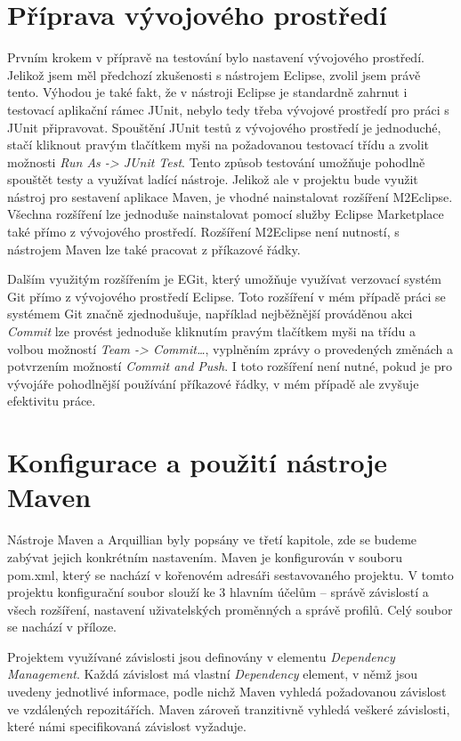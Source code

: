 \documentclass[
    color,   %
	table,   %
    twoside, %
]{fithesis3}
\begin{document}
\section{Příprava vývojového prostředí}
Prvním krokem v přípravě na testování bylo nastavení vývojového prostředí. Jelikož jsem měl předchozí zkušenosti s nástrojem Eclipse, zvolil jsem právě tento. Výhodou je také fakt, že v nástroji Eclipse je standardně zahrnut i testovací aplikační rámec JUnit, nebylo tedy třeba vývojové prostředí  pro práci s JUnit připravovat. Spouštění JUnit testů z vývojového prostředí je jednoduché, stačí kliknout pravým tlačítkem myši na požadovanou testovací třídu a zvolit možnosti \emph{Run As -> JUnit Test}. Tento způsob testování umožňuje pohodlně spouštět testy a využívat ladící nástroje. Jelikož ale v projektu bude využit nástroj pro sestavení aplikace Maven, je vhodné nainstalovat rozšíření M2Eclipse. Všechna rozšíření lze jednoduše nainstalovat pomocí služby Eclipse Marketplace také přímo z vývojového prostředí. Rozšíření M2Eclipse není nutností, s nástrojem Maven lze také pracovat z příkazové řádky.

Dalším využitým rozšířením je EGit, který umožňuje využívat verzovací systém Git přímo z vývojového prostředí Eclipse. Toto rozšíření v mém případě práci se systémem Git značně zjednodušuje, například nejběžnější prováděnou akci \emph{Commit} lze provést jednoduše kliknutím pravým tlačítkem myši na třídu a volbou možností \emph{Team -> Commit\ldots}, vyplněním zprávy o provedených změnách a potvrzením možností \emph{Commit and Push}. I toto rozšíření není nutné, pokud je pro vývojáře pohodlnější používání příkazové řádky, v mém případě ale zvyšuje efektivitu práce.

\section{Konfigurace a použití nástroje Maven}
Nástroje Maven a Arquillian byly popsány ve třetí kapitole, zde se budeme zabývat jejich konkrétním nastavením. Maven je konfigurován v souboru pom.xml, který se nachází v kořenovém adresáři sestavovaného projektu. V tomto projektu konfigurační soubor slouží ke 3 hlavním účelům – správě závislostí a všech rozšíření, nastavení uživatelských proměnných a správě profilů. Celý soubor se nachází v příloze.

Projektem využívané závislosti jsou definovány v elementu \emph{Dependency Management}. Každá závislost má vlastní \emph{Dependency} element, v němž jsou uvedeny jednotlivé informace, podle nichž Maven vyhledá požadovanou závislost ve vzdálených repozitářích. Maven zároveň tranzitivně vyhledá veškeré závislosti, které námi specifikovaná závislost vyžaduje.
\end{document}
